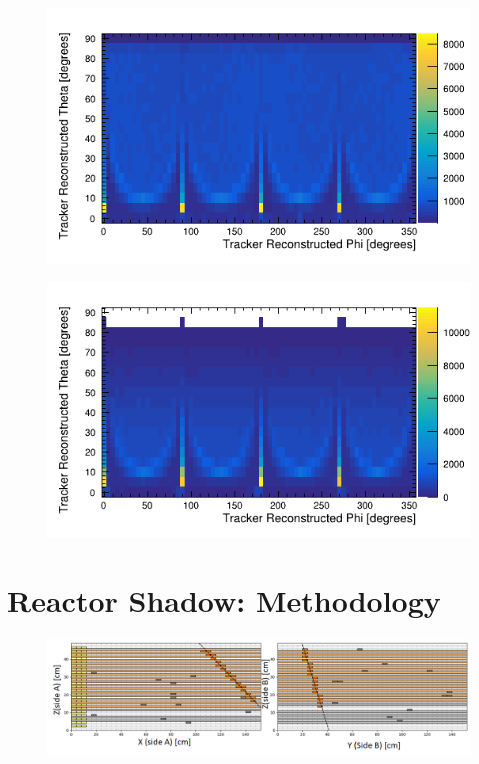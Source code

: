 \begin{figure}[H]
 \centering
 \includegraphics[width=0.8\linewidth]{Chapter5/Figs/Raster/phi_vs_theta_hem_simNoDead.png}
 \label{fig:simulatedHemisphereDist}
\end{figure}

\begin{figure}[H]
 \centering
 \includegraphics[width=0.8\linewidth]{Chapter5/Figs/Raster/simulatedNormalDistirbution.png}
 \label{fig:simulatedNormalDist}
\end{figure}

\section{Reactor Shadow: Methodology} \label{sec:ReactorShadowMethodology}

\begin{figure}[H]
 \centering
 \includegraphics[width=\linewidth]{Chapter5/Figs/Raster/3000ExampleEvent.png}
 \label{fig:3000ExampleEvent}
\end{figure}


